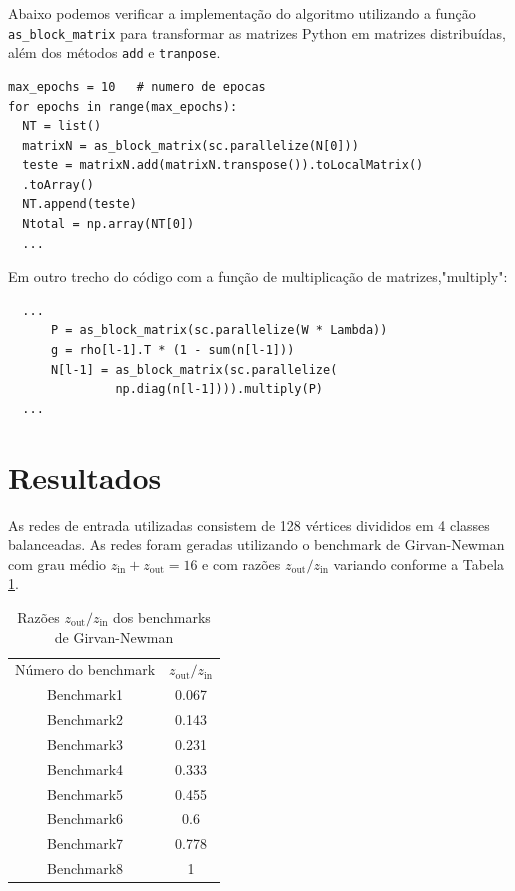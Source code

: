 \documentclass[conference]{IEEEtran}
\begin{document}
Abaixo podemos verificar a implementação do algoritmo utilizando a função \texttt{as\_block\_matrix} para transformar as matrizes Python em matrizes distribuídas, além dos métodos \texttt{add} e \texttt{tranpose}.

\lstset{language=Python}
\lstset{frame=lines}
\lstset{basicstyle=\footnotesize}
\begin{lstlisting}
max_epochs = 10   # numero de epocas
for epochs in range(max_epochs):
  NT = list()
  matrixN = as_block_matrix(sc.parallelize(N[0]))
  teste = matrixN.add(matrixN.transpose()).toLocalMatrix()
  .toArray()
  NT.append(teste)
  Ntotal = np.array(NT[0]) 
  ...

\end{lstlisting}

Em outro trecho do código com a função de multiplicação de matrizes,"multiply": 

\lstset{language=Python}
\lstset{frame=lines}
\lstset{basicstyle=\footnotesize}
\begin{lstlisting}
  ...
      P = as_block_matrix(sc.parallelize(W * Lambda))
      g = rho[l-1].T * (1 - sum(n[l-1]))
      N[l-1] = as_block_matrix(sc.parallelize(
               np.diag(n[l-1]))).multiply(P)
  ...

\end{lstlisting}



\section{Resultados}\label{AA}

 As redes de entrada utilizadas consistem de 128 vértices divididos em 4 classes balanceadas.  As redes foram geradas utilizando o benchmark de Girvan-Newman\cite{b15} com grau médio $z_\text{in} + z_\text{out} = 16$ e com razões $z_\text{out}/z_\text{in}$ variando conforme a Tabela \ref{tab:benchmark}.

\begin{table}[h!]
\centering
\caption{Razões $z_\text{out}/z_\text{in}$ dos benchmarks de Girvan-Newman}
\label{tab:benchmark}
\begin{tabular}{c c}
Número do benchmark & $z_{\text{out}}/z_{\text{in}}$ \\
Benchmark1 & 0.067 \\
Benchmark2 & 0.143\\
Benchmark3 & 0.231\\
Benchmark4 & 0.333  \\
Benchmark5 & 0.455  \\           
Benchmark6 & 0.6  \\ 
Benchmark7 & 0.778 \\ 
Benchmark8 & 1
\end{tabular}
\end{table}
\end{document}
